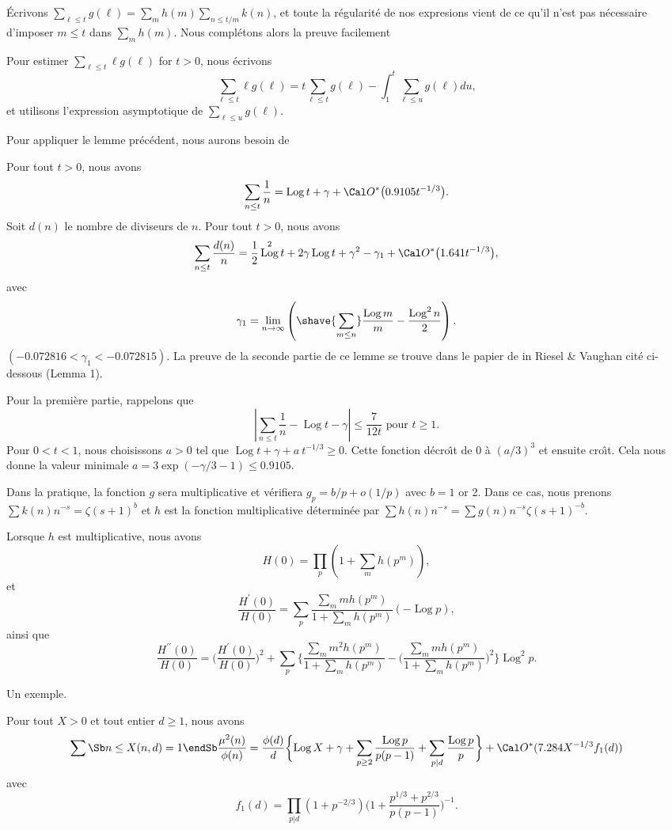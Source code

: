 \documentclass[12pt,a4paper,twoside]{article}
\DeclareMathOperator{\Log}{Log}
\begin{document}
\'Ecrivons
$\sum_{\ell\le t}g({\ell})=\sum_{m}h(m)\sum_{n\le t/m}k(n)$, et toute
la r\'egularit\'e de nos expresions vient de ce qu'il n'est pas
n\'ecessaire d'imposer $m\le t$ dans $\sum_{m}h(m)$.
Nous compl\'etons alors la preuve facilement

Pour estimer $\sum_{\ell\le t}\ell g({\ell})$ for $t>0$, nous \'ecrivons
$$
\sum_{\ell\le t}\ell g({\ell})=
t\sum_{\ell\le t}g({\ell})-
\int_1^t \sum_{\ell\le u}g({\ell})du,
$$
et utilisons l'expression asymptotique de $\sum_{\ell\le u}g({\ell})$.
\fin


Pour appliquer le lemme pr\'ec\'edent, nous aurons besoin de

 Pour tout $t>0$, nous avons
$$
\sum_{n\le t}\frac 1n=\Log t+\gamma+\O\big(0.9105 t^{-1/3}\big).
$$
Soit $d(n)$ le nombre de diviseurs de $n$. Pour tout $t>0$, nous avons
$$
\sum_{n\le t}\frac{d(n)}n=
\frac12\Log^2t+2\gamma\Log t+\gamma^2-\gamma_1+\O\big(1.641 t^{-1/3}\big),
$$
avec
$$
\gamma_1=\lim_{n\rightarrow\infty}
\left(\shave{\sum_{m\le n}}\frac{\Log m}m-\frac{\Log^2n}2
\right).
$$
$(-0.072816<\gamma_1<-0.072815)$.
\endproclaim
\goodbreak
{}
La preuve de la seconde partie de ce lemme se trouve dans le papier de
in Riesel \& Vaughan cit\'e ci-dessous
(Lemma 1).

Pour la premi\`ere partie, rappelons que
$$
|\sum_{n\le t}\frac1n-\Log t-\gamma|\le\frac{7}{12t}
\text{\ \ pour\ \ }t\ge1.
$$
Pour $0<t<1$, nous choisissons $a>0$ tel que $\Log t+\gamma+a\ t^{-1/3}\ge0$. Cette
fonction d\'ecro\^\i t de $0$ \`a $(a/3)^3$ et ensuite cro\^\i t. Cela
nous donne la valeur minimale $a=3\exp(-\gamma/3-1)\le0.9105$.
\fin

Dans la pratique, la fonction $g$ sera multiplicative et v\'erifiera
$g_p=b/p+o(1/p)$ avec $b=1$ or 2. Dans ce cas, nous prenons $\sum
k(n)n^{-s}=\zeta(s+1)^b$ et $h$ est la fonction multiplicative
d\'etermin\'ee par $\sum h(n)n^{-s}=\sum g(n)n^{-s}\zeta(s+1)^{-b}$.

Lorsque $h$ est multiplicative, nous avons
$$
H(0)=\prod_p(1+\sum_mh({p^m})),
$$
et
$$
\frac{H^{\prime}(0)}{H(0)}=
\sum_p
\frac{\sum_mmh({p^m})}{1+\sum_mh({p^m})}(-\Log p),
$$
ainsi que
$$
\frac{H^{\prime\prime}(0)}{H(0)}=
\bigg(
\frac{H^{\prime}(0)}{H(0)}
\bigg)^2+
\sum_p
\bigg\{
\frac{\sum_mm^2h({p^m})}{1+\sum_mh({p^m})}
-\bigg(\frac{\sum_mmh({p^m})}{1+\sum_mh({p^m})}\bigg)^2
\bigg\}
\Log^2p.
$$

Un exemple.

 Pour tout $X>0$ et tout entier $d\ge1$, nous avons
$$
\sum\Sb n\le X\\ (n,d)=1\endSb
\frac{\mu^2(n)}{\phi(n)}=
\frac{\phi(d)}d
\bigg\{\!
\Log X+
\gamma+\sum_{p\ge2}\frac{\Log p}{p(p-1)}
+\sum_{p|d}\frac{\Log p}{p}
\bigg\}
+\O(
7.284 X^{-1/3}f_1(d))
$$
avec
$$
f_1(d)=
\prod_{p|d}
(1+p^{-2/3})
\big(1+\frac{p^{1/3}+p^{2/3}}{p(p-1)}\big)^{-1}.
$$
\endproclaim
\end{document}
